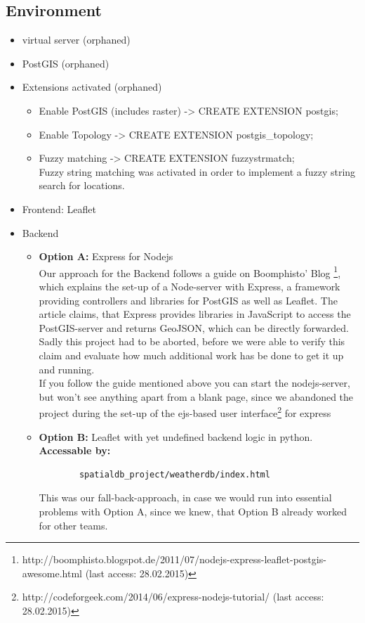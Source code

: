 \documentclass[paper=a4, fontsize=11pt]{article} %
\numberwithin{equation}{section} %
\numberwithin{figure}{section} %
\numberwithin{table}{section} %
\begin{document}
\subsection{Environment}
\begin{itemize}
	\item virtual server (orphaned)
    \item PostGIS (orphaned)
    \item Extensions activated (orphaned)
    \begin{itemize}
    	\item Enable PostGIS (includes raster) -> CREATE EXTENSION postgis;
   		\item Enable Topology -> CREATE EXTENSION postgis\_topology;
    	\item Fuzzy matching -> CREATE EXTENSION fuzzystrmatch;\\
    	Fuzzy string matching was activated in order to implement a fuzzy string search for locations.
    \end{itemize}
    \item Frontend: Leaflet
    \item Backend
     \begin{itemize}
    	\item \textbf{Option A:} Express for Nodejs\\ [0.1cm]
    	Our approach for the Backend follows a guide on Boomphisto' Blog
    	\footnote{http://boomphisto.blogspot.de/2011/07/nodejs-express-leaflet-postgis-awesome.html (last access: 28.02.2015)}, which explains the set-up of a Node-server with Express, a framework providing controllers and libraries for PostGIS as well as Leaflet.
    	The article claims, that Express provides libraries in JavaScript to access the PostGIS-server and returns GeoJSON, which can be directly forwarded.\\ Sadly this project had to be aborted, before we were able to verify this claim and evaluate how much additional work has be done to get it up and running.\\
    	If you follow the guide mentioned above you can start the nodejs-server, but won't see anything apart from a blank page, since we abandoned the project during the set-up of the ejs-based user interface\footnote{http://codeforgeek.com/2014/06/express-nodejs-tutorial/ (last access: 28.02.2015)} for express 
   		\item \textbf{Option B:} Leaflet with yet undefined backend logic in python.\\ [0.1cm]
   		\textbf {Accessable by:}
   		\begin{lstlisting}
   		spatialdb_project/weatherdb/index.html
   		\end{lstlisting}
   		This was our fall-back-approach, in case we would run into essential problems with Option A, since we knew, that Option B already worked for other teams.
    \end{itemize}
\end{itemize}
\end{document}
